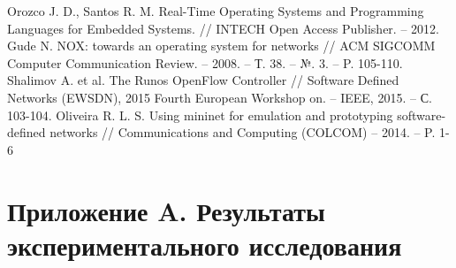 \documentclass[12pt, a4paper]{article}
\begin{document}
\begin{thebibliography}{}
	Orozco J. D., Santos R. M. Real-Time Operating Systems and Programming Languages for Embedded Systems. // INTECH Open Access Publisher. -- 2012.
	Gude N. NOX: towards an operating system for networks // ACM SIGCOMM Computer Communication Review. -- 2008. -- Т. 38. -- №. 3. -- P. 105-110.
	Shalimov A. et al. The Runos OpenFlow Controller // Software Defined Networks (EWSDN), 2015 Fourth European Workshop on. -- IEEE, 2015. -- С. 103-104.
	Oliveira R. L. S. Using mininet for emulation and prototyping software-defined networks // Communications and Computing (COLCOM) -- 2014. -- P. 1-6
\end{thebibliography}


\section*{Приложение A. Результаты экспериментального исследования} \label{sec:results}
\end{document}
